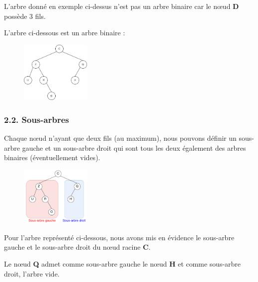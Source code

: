 \documentclass[
  a4paper,
  DIV=11,
  numbers=noendperiod]{scrartcl}
\begin{document}
L'arbre donné en exemple ci-dessus n'est pas un arbre binaire car le
nœud \textbf{D} possède 3 fils.

L'arbre ci-dessous est un arbre binaire :

\begin{figure}

{\centering \includegraphics[width=0.3\textwidth,height=\textheight]{arbre_bin.png}

}

\end{figure}

\hypertarget{sous-arbres}{%
\subsubsection{2.2. Sous-arbres}\label{sous-arbres}}

Chaque nœud n'ayant que deux fils (au maximum), nous pouvons définir un
sous-arbre gauche et un sous-arbre droit qui sont tous les deux
également des arbres binaires (éventuellement vides).

\begin{figure}

{\centering \includegraphics[width=0.3\textwidth,height=\textheight]{arbre_bin2.png}

}

\end{figure}

\begin{tcolorbox}[enhanced jigsaw, titlerule=0mm, opacityback=0, toptitle=1mm, opacitybacktitle=0.6, breakable, colback=white, title=\textcolor{quarto-callout-caution-color}{\faFire}\hspace{0.5em}{Exemple}, bottomtitle=1mm, arc=.35mm, colbacktitle=quarto-callout-caution-color!10!white, rightrule=.15mm, bottomrule=.15mm, leftrule=.75mm, toprule=.15mm, left=2mm, coltitle=black]

Pour l'arbre représenté ci-dessous, nous avons mis en évidence le
sous-arbre gauche et le sous-arbre droit du nœud racine \textbf{C}.

Le nœud \textbf{Q} admet comme sous-arbre gauche le nœud \textbf{H} et
comme sous-arbre droit, l'arbre vide.

\end{tcolorbox}
\end{document}
